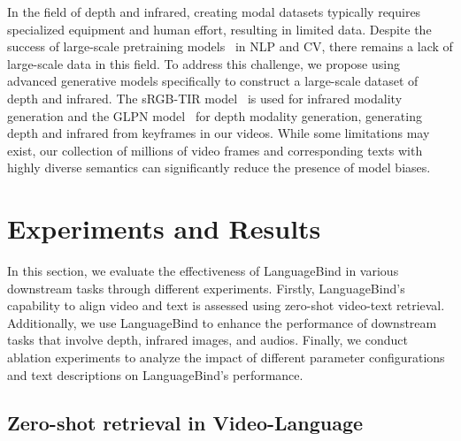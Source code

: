 \documentclass{article} \usepackage{iclr2024_conference,times}
\begin{document}
In the field of depth and infrared, creating modal datasets typically requires specialized equipment and human effort, resulting in limited data. Despite the success of large-scale pretraining models~\citep{radford2021learning,laionclap2023,luo2022clip4clip,chen2023vast} in NLP and CV, there remains a lack of large-scale data in this field. To address this challenge, we propose using advanced generative models specifically to construct a large-scale dataset of depth and infrared. The sRGB-TIR model~\citep{lee2023edge} is used for infrared modality generation and the GLPN model~\citep{kim2022global} for depth modality generation, generating depth and infrared from keyframes in our videos. While some limitations may exist, our collection of millions of video frames and corresponding texts with highly diverse semantics can significantly reduce the presence of model biases.



\section{Experiments and Results}
\label{sec:exp_and_res}
In this section, we evaluate the effectiveness of LanguageBind in various downstream tasks through different experiments. Firstly, LanguageBind's capability to align video and text is assessed using zero-shot video-text retrieval. Additionally, we use LanguageBind to enhance the performance of downstream tasks that involve depth, infrared images, and audios. Finally, we conduct ablation experiments to analyze the impact of different parameter configurations and text descriptions on LanguageBind's performance.






\subsection{Zero-shot retrieval in Video-Language} 
\end{document}
